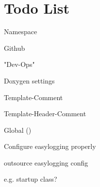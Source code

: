 \chapter{Todo List}
\hypertarget{todo}{}\label{todo}

\begin{DoxyRefList}
\item[Namespace \doxylink{namespaceWIP}{WIP} ]\label{todo__todo000001}%
%

\begin{DoxyItemize}
\item Github
\item "{}\+Dev-\/\+Ops"{}
\item Doxygen settings
\item Template-\/\+Comment
\item Template-\/\+Header-\/\+Comment 
\end{DoxyItemize}
\item[Global \doxylink{namespaceWIP_a8abade321630427e408845cf8b194c56}{WIP\+::example\+Easy\+Logging} ()]\label{todo__todo000002}%
%

\begin{DoxyItemize}
\item Configure easylogging properly
\item outsource easylogging config
\begin{DoxyItemize}
\item e.\+g. startup class? 
\end{DoxyItemize}
\end{DoxyItemize}
\end{DoxyRefList}